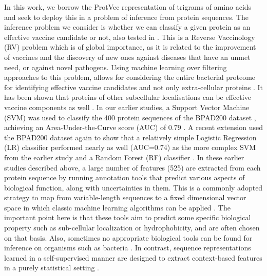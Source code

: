 \documentclass[10pt,journal,compsoc,twoside]{IEEEtran}
\begin{document}
In this work, we borrow the ProtVec representation of trigrams of amino acids and seek to deploy this in a problem of inference from protein sequences. The inference problem we consider is whether we can classify a given protein as an effective vaccine candidate or not, also tested in \cite{heinson_2017,heinson_2019,dalsass_2019}. This is a Reverse Vaccinology (RV) problem \cite{moxon_2019} which is of global importance, as it is related to the improvement of vaccines and the discovery of new ones against diseases that have an unmet need, or against novel pathogens. Using machine learning over filtering approaches to this problem, allows for considering the entire bacterial proteome for identifying effective vaccine candidates and not only extra-cellular proteins \cite{bowman_2011}. It has been shown that proteins of other subcellular localisations can be effective vaccine components as well \cite{nebenzahl_2007,fritzer_2010,henningham_2012}. In our earlier studies, a Support Vector Machine (SVM) was used to classify the 400 protein sequences of the BPAD200 dataset \cite{heinson_2017}, achieving an Area-Under-the-Curve score (AUC) of 0.79 \cite{heinson_2017}. A recent extension \cite{heinson_2019} used the BPAD200 dataset again to show that a relatively simple Logistic Regression (LR) classifier performed nearly as well (AUC=0.74) as the more complex SVM from the earlier study \cite{heinson_2017} and a Random Forest (RF) classifier \cite{heinson_2019}. In these earlier studies \cite{heinson_2017,heinson_2019} described above, a large number of features (525) are extracted from each protein sequence by running annotation tools that predict various aspects of biological function, along with uncertainties in them. This is a commonly adopted strategy to map from variable-length sequences to a fixed dimensional vector space in which classic machine learning algorithms can be applied \cite{dalsass_2019}. The important point here is that these tools aim to predict some specific biological property such as sub-cellular localization or hydrophobicity, and are often chosen on that basis. Also, sometimes no appropriate biological tools can be found for inference on organisms such as bacteria \cite{heinson_2019}. In contrast, sequence representations learned in a self-supervised manner are designed to extract context-based features in a purely statistical setting \cite{protvec}.  
\end{document}
